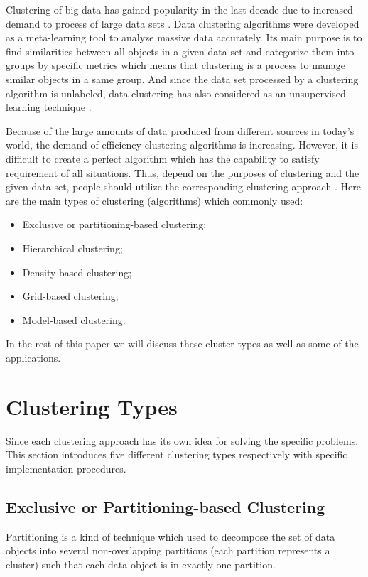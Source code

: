 \documentclass[sigconf]{acmart}
\begin{document}
Clustering of big data has gained popularity in the last decade due to increased demand to process of large data sets \cite{bcab}. Data clustering algorithms were developed as a meta-learning tool to analyze massive data accurately. Its main purpose is to find similarities between all objects in a given data set and categorize them into groups by specific metrics which means that clustering is a process to manage similar objects in a same group. And since the data set processed by a clustering algorithm is unlabeled, data clustering has also considered as an unsupervised learning technique \cite{dcaa}.

Because of the large amounts of data produced from different sources in today's world, the demand of efficiency clustering algorithms is increasing. However, it is difficult to create a perfect algorithm which has the capability to satisfy requirement of all situations. Thus, depend on the purposes of clustering and the given data set, people should utilize the corresponding clustering approach \cite{bcab}. Here are the main types of clustering (algorithms) which commonly used:
\begin{itemize}
\item Exclusive or partitioning-based clustering;
\item Hierarchical clustering;
\item Density-based clustering;
\item Grid-based clustering;
\item Model-based clustering.
\end{itemize}
In the rest of this paper we will discuss these cluster types as well as some of the applications.

\section{Clustering Types}
Since each clustering approach has its own idea for solving the specific problems. This section introduces five different clustering types respectively with specific implementation procedures.
\subsection{Exclusive or Partitioning-based Clustering}

Partitioning is a kind of technique which used to decompose the set of data objects into several non-overlapping partitions (each partition represents a cluster) such that each data object is in exactly one partition.
\end{document}
